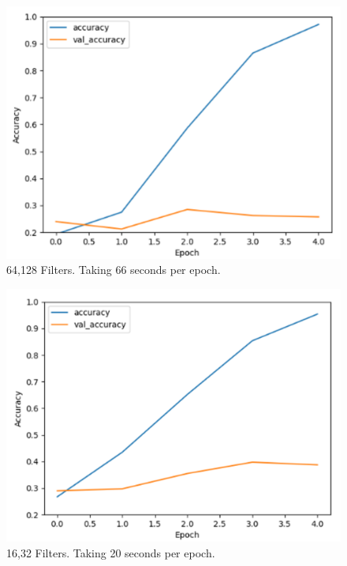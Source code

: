 \begin{figure}[H]
\centering
\includegraphics[scale=1.0]{Media/Testing/fig5.png}
\caption{64,128 Filters. Taking 66 seconds per epoch.}
\label{fig5}
\end{figure}

\begin{figure}[H]
\centering
\includegraphics[scale=1.0]{Media/Testing/fig6.png}
\caption{16,32 Filters. Taking 20 seconds per epoch.}
\label{fig6}
\end{figure}

